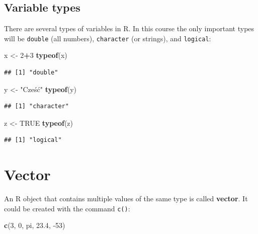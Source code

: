 \documentclass[
]{book}
\newenvironment{Shaded}{\begin{snugshade}}{\end{snugshade}}
\newcommand{\DecValTok}[1]{\textcolor[rgb]{0.00,0.00,0.81}{#1}}
\newcommand{\FloatTok}[1]{\textcolor[rgb]{0.00,0.00,0.81}{#1}}
\newcommand{\KeywordTok}[1]{\textcolor[rgb]{0.13,0.29,0.53}{\textbf{#1}}}
\newcommand{\NormalTok}[1]{#1}
\newcommand{\OperatorTok}[1]{\textcolor[rgb]{0.81,0.36,0.00}{\textbf{#1}}}
\newcommand{\OtherTok}[1]{\textcolor[rgb]{0.56,0.35,0.01}{#1}}
\newcommand{\StringTok}[1]{\textcolor[rgb]{0.31,0.60,0.02}{#1}}
\begin{document}
\hypertarget{variable-types}{%
\subsection{Variable types}\label{variable-types}}

There are several types of variables in R. In this course the only important types will be \texttt{double} (all numbers), \texttt{character} (or strings), and \texttt{logical}:

\begin{Shaded}
\begin{Highlighting}[]
\NormalTok{x <-}\StringTok{ }\DecValTok{2}\OperatorTok{+}\DecValTok{3}
\KeywordTok{typeof}\NormalTok{(x)}
\end{Highlighting}
\end{Shaded}

\begin{verbatim}
## [1] "double"
\end{verbatim}

\begin{Shaded}
\begin{Highlighting}[]
\NormalTok{y <-}\StringTok{ "Cześć"}
\KeywordTok{typeof}\NormalTok{(y)}
\end{Highlighting}
\end{Shaded}

\begin{verbatim}
## [1] "character"
\end{verbatim}

\begin{Shaded}
\begin{Highlighting}[]
\NormalTok{z <-}\StringTok{ }\OtherTok{TRUE}
\KeywordTok{typeof}\NormalTok{(z)}
\end{Highlighting}
\end{Shaded}

\begin{verbatim}
## [1] "logical"
\end{verbatim}

\hypertarget{vector}{%
\section{Vector}\label{vector}}

An R object that contains multiple values of the same type is called \textbf{vector}. It could be created with the command \texttt{c()}:

\begin{Shaded}
\begin{Highlighting}[]
\KeywordTok{c}\NormalTok{(}\DecValTok{3}\NormalTok{, }\DecValTok{0}\NormalTok{, pi, }\FloatTok{23.4}\NormalTok{, }\DecValTok{-53}\NormalTok{)}
\end{Highlighting}
\end{Shaded}
\end{document}
